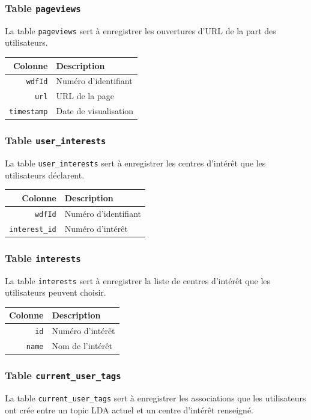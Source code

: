 		\subsubsection{Table \texttt{pageviews}}\label{table-pageviews}
			La table \texttt{pageviews} sert à enregistrer les ouvertures d'URL de la part des utilisateurs.

			\begin{tabular}{rl}
				\textbf{Colonne} & \textbf{Description} \\
				\hline
			    \texttt{wdfId} & Numéro d'identifiant \\
				\texttt{url}   & URL de la page \\
				\texttt{timestamp} & Date de visualisation \\
			\end{tabular}
		
		\subsubsection{Table \texttt{user\_interests}}\label{table-user-interests}
			La table \texttt{user\_interests} sert à enregistrer les centres d'intérêt que les utilisateurs déclarent.

			\begin{tabular}{rl}
				\textbf{Colonne} & \textbf{Description} \\
				\hline
			    \texttt{wdfId} & Numéro d'identifiant \\
				\texttt{interest\_id} & Numéro d'intérêt \\
			\end{tabular}
		
		\subsubsection{Table \texttt{interests}}\label{table-interests}
			La table \texttt{interests} sert à enregistrer la liste de centres d'intérêt que les utilisateurs peuvent choisir.

			\begin{tabular}{rl}
				\textbf{Colonne} & \textbf{Description} \\
				\hline
			    \texttt{id} & Numéro d'intérêt \\
				\texttt{name} & Nom de l'intérêt \\
			\end{tabular}
		
		\subsubsection{Table \texttt{current\_user\_tags}}\label{table-current-user-tags}
			La table \texttt{current\_user\_tags} sert à enregistrer les associations que les utilisateurs ont crée entre un topic LDA actuel et un centre d'intérêt renseigné.

